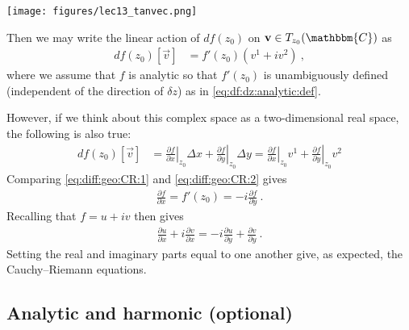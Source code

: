 \begin{center}
\texttt{[image: figures/lec13\_tanvec.png]}
\end{center}
Then we may write the linear action of $df(z_0)$ on $\vec v \in T_{z_0}(\mathbbm{C})$ as
\begin{align}
	df(z_0)\left[\vec{v}\right] &=
	f'(z_0)\left(v^1 + i v^2\right)
	\ ,
	\label{eq:diff:geo:CR:1}
\end{align}
where we assume that $f$ is analytic so that $f'(z_0)$ is unambiguously defined (independent of the direction of $\delta z$) as in \eqref{eq:df:dz:analytic:def}. 

However, if we think about this complex space as a two-dimensional real space, the following is also true:
\begin{align}
	df(z_0)\left[\vec{v}\right] &=
	\left.\frac{\partial f}{\partial x}\right|_{z_0} \Delta x
	+
	\left.\frac{\partial f}{\partial y}\right|_{z_0} \Delta y
	=
	\left.\frac{\partial f}{\partial x}\right|_{z_0} v^1
	+
	\left.\frac{\partial f}{\partial y}\right|_{z_0} v^2
	\label{eq:diff:geo:CR:2}
\end{align}
Comparing \eqref{eq:diff:geo:CR:1} and \eqref{eq:diff:geo:CR:2} gives 
\begin{align}
	\frac{\partial f}{\partial x} = f'(z_0) = - i\frac{\partial f}{\partial y} \ .
\end{align}
Recalling that $f= u+iv$ then gives
\begin{align}
	\frac{\partial u}{\partial x}
	+ i
	\frac{\partial v}{\partial x}
	=
	-i
	\frac{\partial u}{\partial y}
	+
	\frac{\partial v}{\partial y} \ .
\end{align}
Setting the real and imaginary parts equal to one another give, as expected, the Cauchy--Riemann equations. 

\subsection{Analytic and harmonic (optional)}

